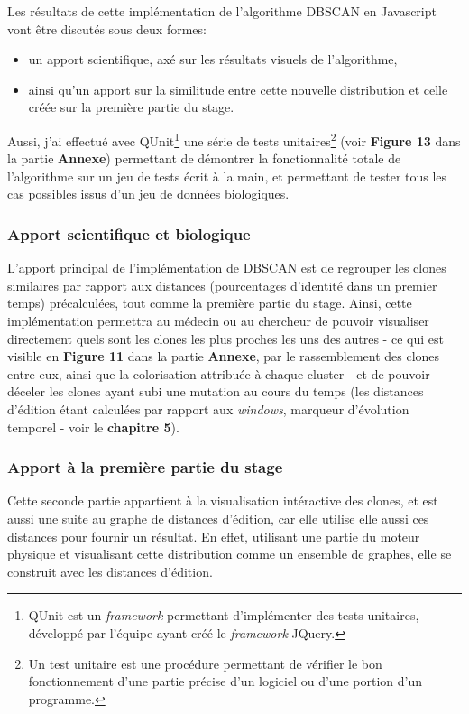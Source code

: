 \documentclass[12pt]{report}
\begin{document}
\begin{spacing}{1.2}
Les résultats de cette implémentation de l'algorithme DBSCAN en Javascript vont être discutés sous deux formes:
	\begin{itemize}
	\item{un apport scientifique, axé sur les résultats visuels de l'algorithme,}
	\item{ainsi qu'un apport sur la similitude entre cette nouvelle distribution et celle créée sur la première partie du stage.}
	\end{itemize}
Aussi, j'ai effectué avec QUnit\footnote{QUnit est un \textit{framework} permettant d'implémenter des tests unitaires, développé par l'équipe ayant créé le \textit{framework} JQuery.} une série de tests unitaires\footnote{Un test unitaire est une procédure permettant de vérifier le bon fonctionnement d'une partie précise d'un logiciel ou d'une portion d'un programme.} (voir \textbf{Figure 13} dans la partie \textbf{Annexe}) permettant de démontrer la fonctionnalité totale de l'algorithme sur un jeu de tests écrit à la main, et permettant de tester tous les cas possibles issus d'un jeu de données biologiques.

\subsubsection{Apport scientifique et biologique}

L'apport principal de l'implémentation de DBSCAN est de regrouper les clones similaires par rapport aux distances (pourcentages d'identité dans un premier temps) précalculées, tout comme la première partie du stage.
\newline
Ainsi, cette implémentation permettra au médecin ou au chercheur de pouvoir visualiser directement quels sont les clones les plus proches les uns des autres - ce qui est visible en \textbf{Figure 11} dans la partie \textbf{Annexe}, par le rassemblement des clones entre eux, ainsi que la colorisation attribuée à chaque cluster - et de pouvoir déceler les clones ayant subi une mutation au cours du temps (les distances d'édition étant calculées par rapport aux \textit{windows}, marqueur d'évolution temporel - voir le \textbf{chapitre 5}).

\subsubsection{Apport à la première partie du stage}

Cette seconde partie appartient à la visualisation intéractive des clones, et est aussi une suite au graphe de distances d'édition, car elle utilise elle aussi ces distances pour fournir un résultat.
\newline
En effet, utilisant une partie du moteur physique et visualisant cette distribution comme un ensemble de graphes, elle se construit avec les distances d'édition.


\end{spacing}
\end{document}
